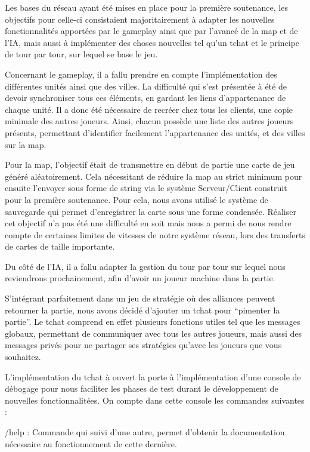 \documentclass[12pt]{report}
\begin{document}
Les bases du réseau ayant été mises en place pour la première soutenance, les
objectifs pour celle-ci consistaient majoritairement à adapter les nouvelles
fonctionnalités apportées par le gameplay ainsi que par l’avancé de la map et
de l’IA, mais aussi à implémenter des choses nouvelles tel qu’un tchat et le
principe de tour par tour, sur lequel se base le jeu.

Concernant le gameplay, il a fallu prendre en compte l’implémentation des
différentes unités ainsi que des villes. La difficulté qui s’est présentée à
été de devoir synchroniser tous ces éléments, en gardant les liens
d'appartenance de chaque unité. Il a donc été nécessaire de recréer chez tous
les clients, une copie minimale des autres joueurs. Ainsi, chacun possède une
liste des autres joueurs présents, permettant d'identifier facilement
l'appartenance des unités, et des villes sur la map.

Pour la map, l’objectif était de transmettre en début de partie une carte de
jeu généré aléatoirement. Cela nécessitant de réduire la map au strict minimum
pour ensuite l’envoyer sous forme de string via le système Serveur/Client
construit pour la première soutenance. Pour cela, nous avons utilisé le système
de sauvegarde qui permet d’enregistrer la carte sous une forme condensée.
Réaliser cet objectif n’a pas été une difficulté en soit mais nous a permi de
nous rendre compte de certaines limites de vitesses de notre système réseau,
lors des transferts de cartes de taille importante.

Du côté de l’IA, il a fallu adapter la gestion du tour par tour sur lequel nous
reviendrons prochainement, afin d'avoir un joueur machine dans la partie.

S'intégrant parfaitement dans un jeu de stratégie où des alliances peuvent
retourner la partie, nous avons décidé d’ajouter un tchat pour “pimenter la
partie”. Le tchat comprend en effet plusieurs fonctions utiles tel que les
messages globaux, permettant de communiquer avec tous les autres joueurs, mais
aussi des messages privés pour ne partager ses stratégies qu’avec les joueurs
que vous souhaitez.

L’implémentation du tchat à ouvert la porte à l’implémentation d’une console de
débogage pour nous faciliter les phases de test durant le développement de
nouvelles fonctionnalitées. On compte dans cette console les commandes
suivantes : 

/help : Commande qui suivi d’une autre, permet d’obtenir la documentation
nécessaire au fonctionnement de cette dernière.
\end{document}
